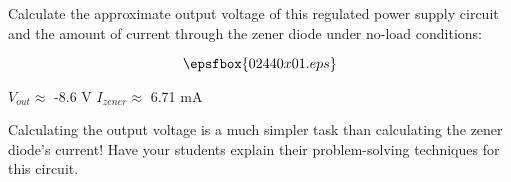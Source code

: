 

Calculate the approximate output voltage of this regulated power supply circuit and the amount of current through the zener diode under no-load conditions:

$$\epsfbox{02440x01.eps}$$







$V_{out} \approx$ -8.6 V \hskip 30pt $I_{zener} \approx$ 6.71 mA







Calculating the output voltage is a much simpler task than calculating the zener diode's current!  Have your students explain their problem-solving techniques for this circuit.




